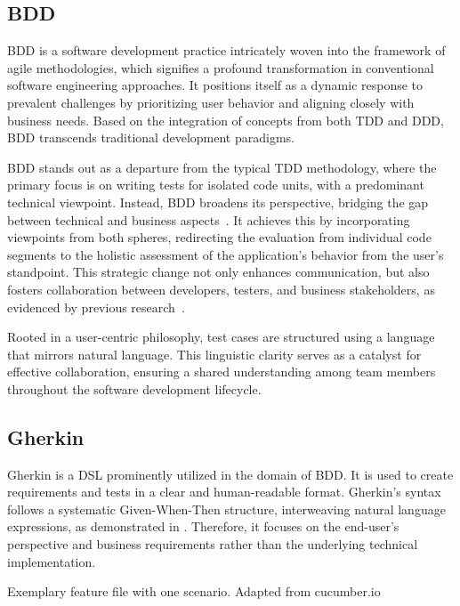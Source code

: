 \subsection{\acl{BDD}}
\label{subsec:bdd}
\acf{BDD} is a software development practice intricately woven into the framework of agile methodologies, which signifies a profound transformation in conventional software engineering approaches. It positions itself as a dynamic response to prevalent challenges by prioritizing user behavior and aligning closely with business needs. Based on the integration of concepts from both \ac{TDD} and \ac{DDD}, \ac{BDD} transcends traditional development paradigms.

\ac{BDD} stands out as a departure from the typical \ac{TDD} methodology, where the primary focus is on writing tests for isolated code units, with a predominant technical viewpoint. Instead, \ac{BDD} broadens its perspective, bridging the gap between technical and business aspects~\cite{Farooq2023bdd,Binamungu2020bdd}. It achieves this by incorporating viewpoints from both spheres, redirecting the evaluation from individual code segments to the holistic assessment of the application's behavior from the user's standpoint. This strategic change not only enhances communication, but also fosters collaboration between developers, testers, and business stakeholders, as evidenced by previous research~\cite{smart2023bdd,pereira2018behavior}.

Rooted in a user-centric philosophy, test cases are structured using a language that mirrors natural language. This linguistic clarity serves as a catalyst for effective collaboration, ensuring a shared understanding among team members throughout the software development lifecycle.

\subsection{Gherkin}
\label{subsec:gherkin}

Gherkin is a \ac{DSL} prominently utilized in the domain of \ac{BDD}. It is used to create requirements and tests in a clear and human-readable format. Gherkin's syntax follows a systematic Given-When-Then structure, interweaving natural language expressions, as demonstrated in . Therefore, it focuses on the end-user's perspective and business requirements rather than the underlying technical implementation.

\begin{listing}[!ht]
\caption{Exemplary feature file with one scenario. Adapted from cucumber.io~\cite{noauthor_getting_nodate}}
\label{lst:withdrawcash}
\inputminted{gherkin}{files/code/atm.feature}
\end{listing}

